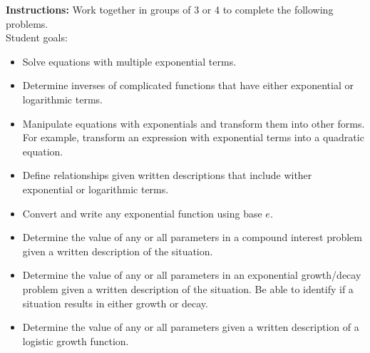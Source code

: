 


\noindent \textbf{Instructions:}  Work together in groups of  3 or 4
to complete the following problems.\\

Student goals:
  \begin{itemize}
  \item Solve equations with multiple exponential terms.
  \item Determine inverses of complicated functions that have either
    exponential or logarithmic terms.
  \item Manipulate equations with exponentials and transform them into
    other forms. For example, transform an expression with exponential
    terms into a quadratic equation.
  \item Define relationships given written descriptions that include
    wither exponential or logarithmic terms.
  \item Convert and write any exponential function using base $e$.
  \item Determine the value of any or all parameters in a compound
    interest problem given a written description of the situation.
  \item Determine the value of any or all parameters in an exponential
    growth/decay problem given a written description of the
    situation. Be able to identify if a situation results in either
    growth or decay.
  \item Determine the value of any or all parameters given a written
    description of a logistic growth function.
  \end{itemize}


  \noindent
{}

